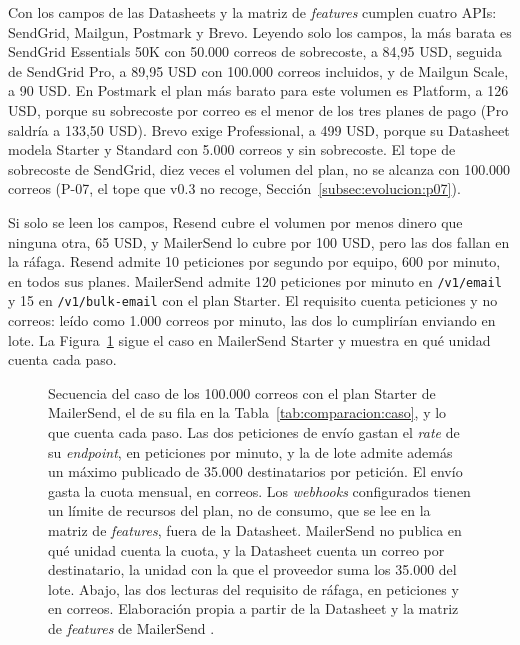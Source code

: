 Con los campos de las Datasheets y la matriz de \textit{features} cumplen cuatro APIs: SendGrid, Mailgun, Postmark y Brevo.
Leyendo solo los campos, la más barata es SendGrid Essentials 50K con 50.000 correos de sobrecoste, a 84,95 USD, seguida de SendGrid Pro, a 89,95 USD con 100.000 correos incluidos, y de Mailgun Scale, a 90 USD.
En Postmark el plan más barato para este volumen es Platform, a 126 USD, porque su sobrecoste por correo es el menor de los tres planes de pago (Pro saldría a 133,50 USD).
Brevo exige Professional, a 499 USD, porque su Datasheet modela Starter y Standard con 5.000 correos y sin sobrecoste.
El tope de sobrecoste de SendGrid, diez veces el volumen del plan, no se alcanza con 100.000 correos (P-07, el tope que v0.3 no recoge, Sección~\ref{subsec:evolucion:p07}).

Si solo se leen los campos, Resend cubre el volumen por menos dinero que ninguna otra, 65 USD, y MailerSend lo cubre por 100 USD, pero las dos fallan en la ráfaga.
Resend admite 10 peticiones por segundo por equipo, 600 por minuto, en todos sus planes.
MailerSend admite 120 peticiones por minuto en \texttt{/v1/email} y 15 en \texttt{/v1/bulk-email} con el plan Starter.
El requisito cuenta peticiones y no correos: leído como 1.000 correos por minuto, las dos lo cumplirían enviando en lote.
La Figura~\ref{fig:comparacion:caso} sigue el caso en MailerSend Starter y muestra en qué unidad cuenta cada paso.

\begin{figure}[tbp]
\centering

\caption[Conteo del caso de los 100.000 correos en el plan Starter de MailerSend]{Secuencia del caso de los 100.000 correos con el plan Starter de MailerSend, el de su fila en la Tabla~\ref{tab:comparacion:caso}, y lo que cuenta cada paso. Las dos peticiones de envío gastan el \textit{rate} de su \textit{endpoint}, en peticiones por minuto, y la de lote admite además un máximo publicado de 35.000 destinatarios por petición. El envío gasta la cuota mensual, en correos. Los \textit{webhooks} configurados tienen un límite de recursos del plan, no de consumo, que se lee en la matriz de \textit{features}, fuera de la Datasheet. MailerSend no publica en qué unidad cuenta la cuota, y la Datasheet cuenta un correo por destinatario, la unidad con la que el proveedor suma los 35.000 del lote. Abajo, las dos lecturas del requisito de ráfaga, en peticiones y en correos. Elaboración propia a partir de la Datasheet y la matriz de \textit{features} de MailerSend \citep{mailersendpricing,mailersenddocs,mailersendemailapi,mailersendbulk}.}
\label{fig:comparacion:caso}
\end{figure}

